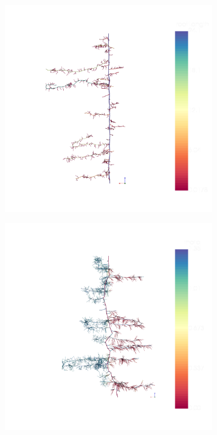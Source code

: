 \begin{figure}
\begin{subfigure}[c]{0.32\textwidth}
\includegraphics[width=0.99\textwidth]{example5a.png}
 \label{fig:elongation}
\end{subfigure}
\begin{subfigure}[c]{0.32\textwidth} 
\includegraphics[width=0.99\textwidth]{example5c.png}

\end{subfigure}
\end{figure}
